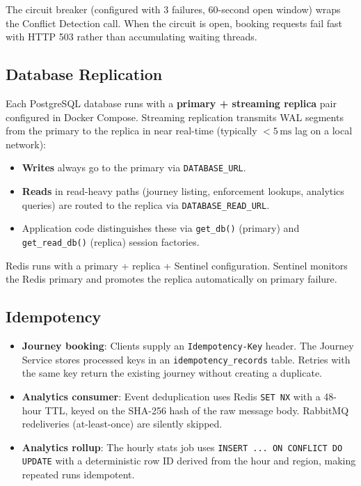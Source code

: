 \documentclass[12pt,a4paper]{article}
\begin{document}
The circuit breaker (configured with 3 failures, 60-second open window) wraps the Conflict Detection call. When the circuit is open, booking requests fail fast with HTTP 503 rather than accumulating waiting threads.

\subsection{Database Replication}

Each PostgreSQL database runs with a \textbf{primary + streaming replica} pair configured in Docker Compose. Streaming replication transmits WAL segments from the primary to the replica in near real-time (typically $<5\,\text{ms}$ lag on a local network):

\begin{itemize}[leftmargin=*]
  \item \textbf{Writes} always go to the primary via \texttt{DATABASE\_URL}.
  \item \textbf{Reads} in read-heavy paths (journey listing, enforcement lookups, analytics queries) are routed to the replica via \texttt{DATABASE\_READ\_URL}.
  \item Application code distinguishes these via \texttt{get\_db()} (primary) and \texttt{get\_read\_db()} (replica) session factories.
\end{itemize}

Redis runs with a primary + replica + Sentinel configuration. Sentinel monitors the Redis primary and promotes the replica automatically on primary failure.

\subsection{Idempotency}

\begin{itemize}[leftmargin=*]
  \item \textbf{Journey booking}: Clients supply an \texttt{Idempotency-Key} header. The Journey Service stores processed keys in an \texttt{idempotency\_records} table. Retries with the same key return the existing journey without creating a duplicate.
  \item \textbf{Analytics consumer}: Event deduplication uses Redis \texttt{SET NX} with a 48-hour TTL, keyed on the SHA-256 hash of the raw message body. RabbitMQ redeliveries (at-least-once) are silently skipped.
  \item \textbf{Analytics rollup}: The hourly stats job uses \texttt{INSERT ... ON CONFLICT DO UPDATE} with a deterministic row ID derived from the hour and region, making repeated runs idempotent.
\end{itemize}
\end{document}
